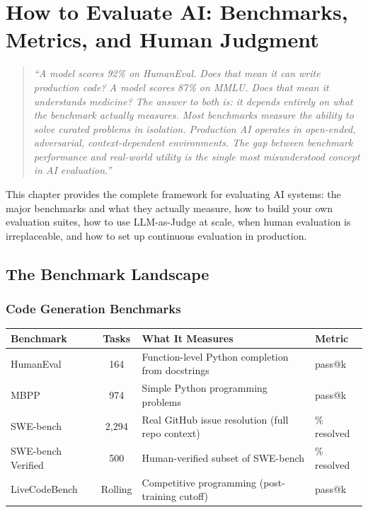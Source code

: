 \chapter{How to Evaluate AI: Benchmarks, Metrics, and Human Judgment}

\begin{quote}
\textit{``A model scores 92\% on HumanEval. Does that mean it can write production code? A model scores 87\% on MMLU. Does that mean it understands medicine? The answer to both is: it depends entirely on what the benchmark actually measures. Most benchmarks measure the ability to solve curated problems in isolation. Production AI operates in open-ended, adversarial, context-dependent environments. The gap between benchmark performance and real-world utility is the single most misunderstood concept in AI evaluation.''}
\end{quote}

This chapter provides the complete framework for evaluating AI systems: the major benchmarks and what they actually measure, how to build your own evaluation suites, how to use LLM-as-Judge at scale, when human evaluation is irreplaceable, and how to set up continuous evaluation in production.

\section{The Benchmark Landscape}

\subsection{Code Generation Benchmarks}

\begin{center}
\begin{tabular}{|l|c|p{4.5cm}|l|}
\hline
\textbf{Benchmark} & \textbf{Tasks} & \textbf{What It Measures} & \textbf{Metric} \\
\hline
HumanEval & 164 & Function-level Python completion from docstrings & pass@k \\
MBPP & 974 & Simple Python programming problems & pass@k \\
SWE-bench & 2,294 & Real GitHub issue resolution (full repo context) & \% resolved \\
SWE-bench Verified & 500 & Human-verified subset of SWE-bench & \% resolved \\
LiveCodeBench & Rolling & Competitive programming (post-training cutoff) & pass@k \\
\hline
\end{tabular}
\end{center}

